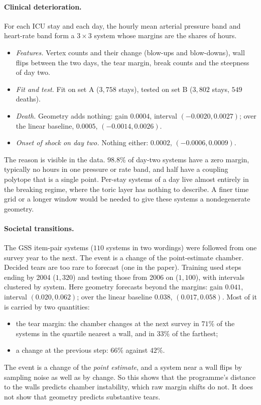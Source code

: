 \documentclass[11pt]{article}
\theoremstyle{definition}
\theoremstyle{remark}
\begin{document}
\paragraph{Clinical deterioration.} For each ICU stay and each day, the hourly mean arterial pressure band and heart-rate band form a
$3\times3$ system whose margins are the shares of hours.
\begin{itemize}[leftmargin=*,nosep]
\item \emph{Features.} Vertex counts and their change (blow-ups and blow-downs), wall flips between the two days, the tear margin, break
  counts and the steepness of day two.
\item \emph{Fit and test.} Fit on set A ($3{,}758$ stays), tested on set B ($3{,}802$ stays, $549$ deaths).
\item \emph{Death.} Geometry adds nothing: gain $0.0004$, interval $(-0.0020, 0.0027)$; over the linear baseline, $0.0005$,
  $(-0.0014, 0.0026)$.
\item \emph{Onset of shock on day two.} Nothing either: $0.0002$, $(-0.0006, 0.0009)$.
\end{itemize}
The reason is visible in the data. $98.8\%$ of day-two systems have a zero margin, typically no hours in one pressure or rate band, and
half have a coupling polytope that is a single point. Per-stay systems of a day live almost entirely in the breaking regime, where the
toric layer has nothing to describe. A finer time grid or a longer window would be needed to give these systems a nondegenerate geometry.

\paragraph{Societal transitions.} The GSS item-pair systems ($110$ systems in two wordings) were followed from one survey year to the next.
The event is a change of the point-estimate chamber. Decided tears are too rare to forecast (one in the paper). Training used steps
ending by 2004 ($1{,}320$) and testing those from 2006 on ($1{,}100$), with intervals clustered by system. Here geometry forecasts
beyond the margins: gain $0.041$, interval $(0.020, 0.062)$; over the linear baseline $0.038$, $(0.017, 0.058)$. Most of it is carried
by two quantities:
\begin{itemize}[leftmargin=*,nosep]
\item the tear margin: the chamber changes at the next survey in $71\%$ of the systems in the quartile nearest a wall, and in $33\%$ of
  the farthest;
\item a change at the previous step: $66\%$ against $42\%$.
\end{itemize}
The event is a change of the \emph{point estimate}, and a system near a wall flips by sampling noise as well as by change. So this shows
that the programme's distance to the walls predicts chamber instability, which raw margin shifts do not. It does not show that geometry
predicts substantive tears.
\end{document}
